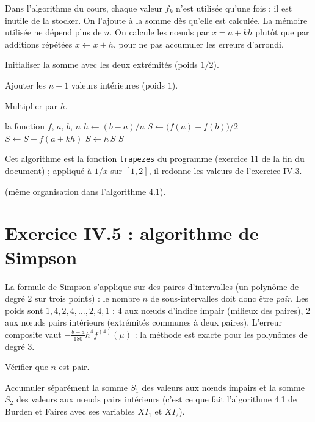 \Pourquoi Dans l'algorithme du cours, chaque valeur $f_k$ n'est utilisée
qu'une fois : il est inutile de la stocker. On l'ajoute à la somme dès qu'elle
est calculée. La mémoire utilisée ne dépend plus de $n$. On calcule les nœuds
par $x = a + kh$ plutôt que par additions répétées $x \leftarrow x + h$, pour
ne pas accumuler les erreurs d'arrondi.

\Etapes
{} Initialiser la somme avec les deux extrémités (poids $1/2$).

 Ajouter les $n-1$ valeurs intérieures (poids $1$).

 Multiplier par $h$.

\begin{algo}
  \Require la fonction $f$, $a$, $b$, $n$
  \State $h \leftarrow (b-a)/n$
  \State $S \leftarrow \bigl(f(a) + f(b)\bigr)/2$
    \State $S \leftarrow S + f(a + kh)$
  \EndFor
  \State $S \leftarrow h\,S$
  \Print $S$
\end{algo}

\Verif Cet algorithme est la fonction \texttt{trapezes} du programme
 (exercice 11 de la fin du document) ; appliqué à
$1/x$ sur $[1,2]$, il redonne les valeurs de l'exercice IV.3.

\Refs {} (même organisation dans l'algorithme 4.1).

\section{Exercice IV.5 : algorithme de Simpson}


\Pourquoi La formule de Simpson s'applique sur des paires d'intervalles (un
polynôme de degré 2 sur trois points) : le nombre $n$ de sous-intervalles doit
donc être \emph{pair}. Les poids sont $1, 4, 2, 4, \dots, 2, 4, 1$ : $4$ aux
nœuds d'indice impair (milieux des paires), $2$ aux nœuds pairs intérieurs
(extrémités communes à deux paires). L'erreur composite vaut
$-\tfrac{b-a}{180}h^4f^{(4)}(\mu)$  : la méthode est
exacte pour les polynômes de degré 3.

\Etapes
{} Vérifier que $n$ est pair.

 Accumuler séparément la somme $S_1$ des valeurs aux nœuds impairs et
la somme $S_2$ des valeurs aux nœuds pairs intérieurs (c'est ce que fait
l'algorithme 4.1 de Burden et Faires avec ses variables $XI_1$ et $XI_2$).

